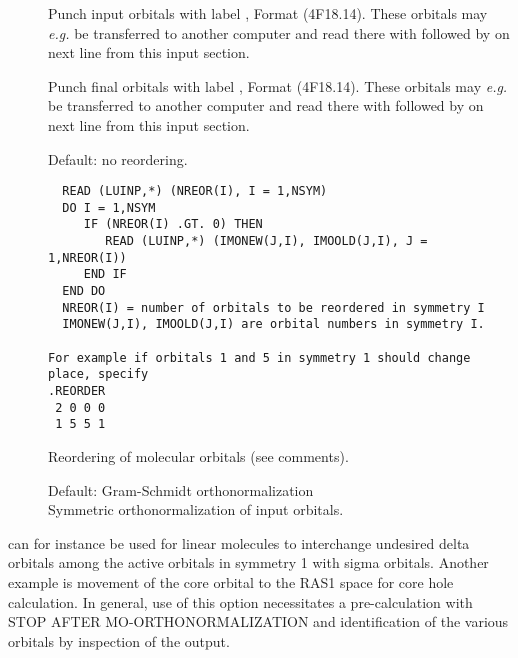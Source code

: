 \begin{description}
\item[]
  Punch input orbitals with label , Format (4F18.14).
  These orbitals may {\it e.g.\/} be transferred to another computer and
  read there with  followed by  on
  next line from this input section.

\item[]
  Punch final orbitals with label , Format (4F18.14).
  These orbitals may {\it e.g.\/} be transferred to another computer and
  read there with  followed by  on
  next line from this input section.

\item[]
Default: no reordering.
\begin{verbatim}
  READ (LUINP,*) (NREOR(I), I = 1,NSYM)
  DO I = 1,NSYM
     IF (NREOR(I) .GT. 0) THEN
        READ (LUINP,*) (IMONEW(J,I), IMOOLD(J,I), J = 1,NREOR(I))
     END IF
  END DO
  NREOR(I) = number of orbitals to be reordered in symmetry I
  IMONEW(J,I), IMOOLD(J,I) are orbital numbers in symmetry I.

For example if orbitals 1 and 5 in symmetry 1 should change place, specify
.REORDER
 2 0 0 0
 1 5 5 1
\end{verbatim}
  Reordering of molecular orbitals (see comments).

\item[]
  Default: Gram-Schmidt orthonormalization\\
  Symmetric orthonormalization of input
  orbitals.

\end{description}



 can for instance be used for
linear molecules to interchange
undesired delta orbitals among the active orbitals in symmetry 1 with
sigma orbitals.  Another example is movement of the core orbital to the
RAS1 space for core hole calculation.  In general, use of this option
necessitates a pre-calculation with STOP AFTER MO-ORTHONORMALIZATION and
identification of the various orbitals by inspection of the output.


\pagebreak[3]
\subsection{\label{ref-popinp}}

